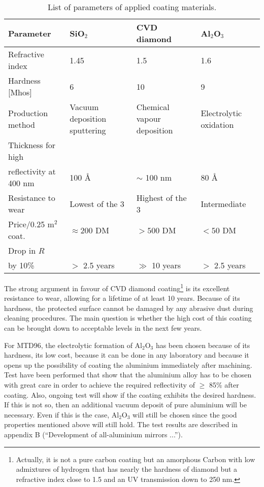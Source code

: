 \begin{table}[htb]
\centering
\begin{tabular}{|p{1.5in}|p{1.15in}|p{1.15in}|p{1.15in}|}
\hline
Parameter & SiO$_{2}$ & CVD diamond & Al$_{2}$O$_{3}$  \\ 
\hline\hline
Refractive index & 1.45 & 1.5 & 1.6   \\ \hline
Hardness [Mhos] & 6 & 10 & 9   \\ \hline
Production method & Vacuum deposition sputtering & Chemical va\-pour deposition
& Electrolytic oxidation   \\ \hline
Thickness for high &  &  &    \\ 
reflectivity at 400 nm & 100 {\AA } & $\sim$ 100 nm  & 80 {\AA }   \\ \hline
Resistance to wear & Lowest of the 3 & Highest of the 3 & Intermediate   \\ 
\hline
Price/0.25 m$^{2}$ coat. \footnotemark & $\approx 200$ DM & $>500$ DM & $<50$ DM 
 \\ \hline
Drop in $R$ &  &  &    \\ 
by 10\% & $>$ 2.5 years & $\gg$ 10 years & $>$ 2.5 years   \\ \hline
\end{tabular}
\caption{\label{tab-coatings}
 List of parameters of applied coating materials.}
\end{table}

The strong argument in favour of CVD diamond coating\footnote{%
Actually, it is not a pure carbon coating but an amorphous Carbon with low
admixtures of hydrogen that has nearly the hardness of diamond but a
refractive index close to 1.5 and an UV transmission down to 250 nm.} is its
excellent resistance to wear, allowing for a lifetime of at least 10 years.
Because of its hardness, the protected surface cannot be damaged by any
abrasive dust during cleaning procedures. The main question is whether the
high cost of this coating can be brought down to acceptable levels in the
next few years.

For MTD96, the electrolytic formation of Al$_2$O$_3$ has been chosen because
of its hardness, its low cost, because it can be done in any laboratory and
because it opens up the possibility of coating the aluminium immediately after
machining. Test have been performed that show that the aluminium alloy has
to be chosen with great care in order to achieve the required reflectivity
of $\geq$ 85\% after coating. Also, ongoing test will show if the coating exhibits the
desired hardness. If this is not so, then an additional vacuum deposit of
pure aluminium will be necessary. Even if this is the case, Al$_2$O$_3$ will still be
chosen since the good properties mentioned above will still hold. The test
results are described in appendix B (``Development of all-aluminium mirrors ...'').

